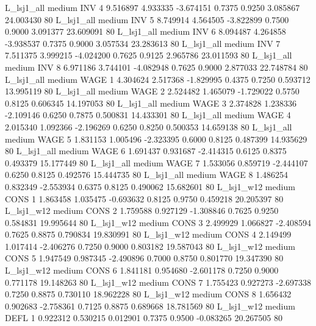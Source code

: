     L_lsj1_all     medium      INV                 4  9.516897 4.933335 -3.674151 0.7375 0.9250  3.085867   24.003430 80
    L_lsj1_all     medium      INV                 5  8.749914 4.564505 -3.822899 0.7500 0.9000  3.091377   23.609091 80
    L_lsj1_all     medium      INV                 6  8.094487 4.264858 -3.938537 0.7375 0.9000  3.057534   23.283613 80
    L_lsj1_all     medium      INV                 7  7.511375 3.999215 -4.024200 0.7625 0.9125  2.965786   23.011593 80
    L_lsj1_all     medium      INV                 8  6.971186 3.744101 -4.082948 0.7625 0.9000  2.877033   22.748784 80
    L_lsj1_all     medium     WAGE                 1  4.304624 2.517368 -1.829995 0.4375 0.7250  0.593712   13.995119 80
    L_lsj1_all     medium     WAGE                 2  2.524482 1.465079 -1.729022 0.5750 0.8125  0.606345   14.197053 80
    L_lsj1_all     medium     WAGE                 3  2.374828 1.238336 -2.109146 0.6250 0.7875  0.500831   14.433301 80
    L_lsj1_all     medium     WAGE                 4  2.015340 1.092366 -2.196269 0.6250 0.8250  0.500353   14.659138 80
    L_lsj1_all     medium     WAGE                 5  1.831153 1.005496 -2.323395 0.6000 0.8125  0.487399   14.935629 80
    L_lsj1_all     medium     WAGE                 6  1.691437 0.931687 -2.414315 0.6125 0.8375  0.493379   15.177449 80
    L_lsj1_all     medium     WAGE                 7  1.533056 0.859719 -2.444107 0.6250 0.8125  0.492576   15.444735 80
    L_lsj1_all     medium     WAGE                 8  1.486254 0.832349 -2.553934 0.6375 0.8125  0.490062   15.682601 80
    L_lsj1_w12     medium     CONS                 1  1.863458 1.035475 -0.693632 0.8125 0.9750  0.459218   20.205397 80
    L_lsj1_w12     medium     CONS                 2  1.759588 0.927129 -1.308846 0.7625 0.9250  0.584831   19.995644 80
    L_lsj1_w12     medium     CONS                 3  2.499929 1.066827 -2.408594 0.7625 0.8875  0.790834   19.830991 80
    L_lsj1_w12     medium     CONS                 4  2.149499 1.017414 -2.406276 0.7250 0.9000  0.803182   19.587043 80
    L_lsj1_w12     medium     CONS                 5  1.947549 0.987345 -2.490896 0.7000 0.8750  0.801770   19.347390 80
    L_lsj1_w12     medium     CONS                 6  1.841181 0.954680 -2.601178 0.7250 0.9000  0.771178   19.148263 80
    L_lsj1_w12     medium     CONS                 7  1.755423 0.927273 -2.697338 0.7250 0.8875  0.730110   18.962228 80
    L_lsj1_w12     medium     CONS                 8  1.656432 0.902683 -2.758361 0.7125 0.8875  0.689668   18.781569 80
    L_lsj1_w12     medium     DEFL                 1  0.922312 0.530215  0.012901 0.7375 0.9500 -0.083265   20.267505 80
